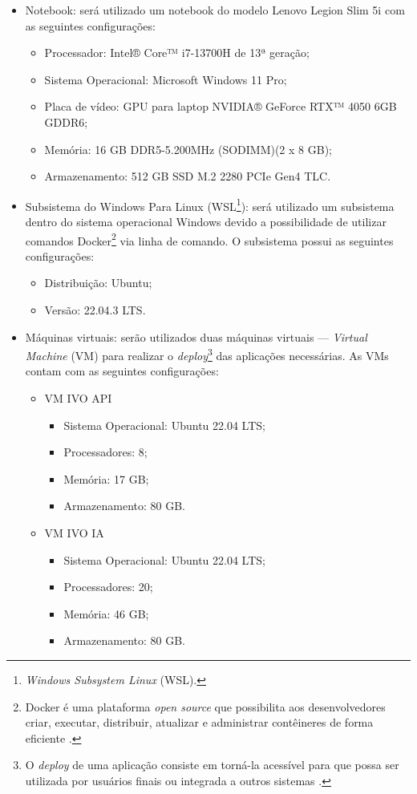 \documentclass[
	12pt,				%
	a4paper,			%
	english,			%
	brazil,				%
	]{article}
\begin{document}
\begin{itemize}
	\item Notebook: será utilizado um notebook do modelo Lenovo Legion Slim 5i com as seguintes configurações:
		\begin{itemize}
			\item Processador: Intel® Core™ i7-13700H de 13ª geração;
			\item Sistema Operacional: Microsoft Windows 11 Pro;
			\item Placa de vídeo: GPU para laptop NVIDIA® GeForce RTX™ 4050 6GB GDDR6;
			\item Memória: 16 GB DDR5-5.200MHz (SODIMM)(2 x 8 GB);
			\item Armazenamento: 512 GB SSD M.2 2280 PCIe Gen4 TLC.
		\end{itemize}
		
	\item Subsistema do Windows Para Linux (WSL\footnote{\textit{Windows Subsystem Linux} (WSL).}): será utilizado um subsistema dentro do sistema operacional Windows devido a possibilidade de utilizar comandos Docker\footnote{Docker é uma plataforma \textit{open source} que possibilita aos desenvolvedores criar, executar, distribuir, atualizar e administrar contêineres de forma eficiente \cite{susnjara2024}.} via linha de comando. O subsistema possui as seguintes configurações:
		\begin{itemize}
			\item Distribuição: Ubuntu;
			\item Versão: 22.04.3 LTS.
		\end{itemize}
		
	\item Máquinas virtuais: serão utilizados duas máquinas virtuais — \textit{Virtual Machine} (VM) para realizar o \textit{deploy}\footnote{O \textit{deploy} de uma aplicação consiste em torná-la acessível para que possa ser utilizada por usuários finais ou integrada a outros sistemas \cite{ibm2025}.} das aplicações necessárias. As VMs contam com as seguintes configurações:
		\begin{itemize}
			\item VM IVO API
				\begin{itemize}
					\item Sistema Operacional: Ubuntu 22.04 LTS;
					\item Processadores: 8;
					\item Memória: 17 GB;
					\item Armazenamento: 80 GB.
				\end{itemize}
			\item VM IVO IA	
				\begin{itemize}
					\item Sistema Operacional: Ubuntu 22.04 LTS;
					\item Processadores: 20;
					\item Memória: 46 GB;
					\item Armazenamento: 80 GB.
				\end{itemize}
		\end{itemize}
		

\end{itemize}
\end{document}
